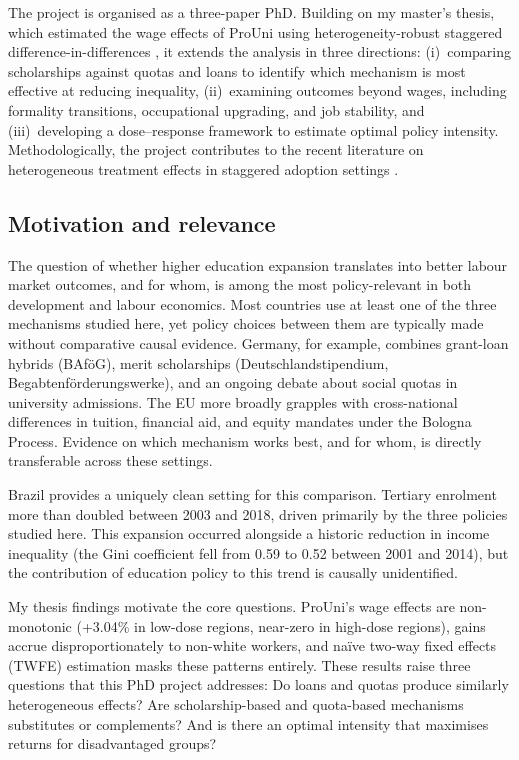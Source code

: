 \documentclass[a4paper,11pt]{article}
\begin{document}
The project is organised as a three-paper PhD. Building on my master's thesis, which estimated the wage effects of ProUni using heterogeneity-robust staggered difference-in-differences \citep{callaway2021}, it extends the analysis in three directions: (i)~comparing scholarships against quotas and loans to identify which mechanism is most effective at reducing inequality, (ii)~examining outcomes beyond wages, including formality transitions, occupational upgrading, and job stability, and (iii)~developing a dose--response framework to estimate optimal policy intensity. Methodologically, the project contributes to the recent literature on heterogeneous treatment effects in staggered adoption settings \citep{roth2023, dechaisemartin2020, goodmanbacon2021}.

\subsection{Motivation and relevance}

The question of whether higher education expansion translates into better labour market outcomes, and for whom, is among the most policy-relevant in both development and labour economics. Most countries use at least one of the three mechanisms studied here, yet policy choices between them are typically made without comparative causal evidence. Germany, for example, combines grant-loan hybrids (BAf\"oG), merit scholarships (Deutschlandstipendium, Begabtenf\"orderungswerke), and an ongoing debate about social quotas in university admissions. The EU more broadly grapples with cross-national differences in tuition, financial aid, and equity mandates under the Bologna Process. Evidence on which mechanism works best, and for whom, is directly transferable across these settings.

Brazil provides a uniquely clean setting for this comparison. Tertiary enrolment more than doubled between 2003 and 2018, driven primarily by the three policies studied here. This expansion occurred alongside a historic reduction in income inequality (the Gini coefficient fell from 0.59 to 0.52 between 2001 and 2014), but the contribution of education policy to this trend is causally unidentified.

My thesis findings motivate the core questions. ProUni's wage effects are non-monotonic (+3.04\% in low-dose regions, near-zero in high-dose regions), gains accrue disproportionately to non-white workers, and na\"ive two-way fixed effects (TWFE) estimation masks these patterns entirely. These results raise three questions that this PhD project addresses: Do loans and quotas produce similarly heterogeneous effects? Are scholarship-based and quota-based mechanisms substitutes or complements? And is there an optimal intensity that maximises returns for disadvantaged groups?
\end{document}
